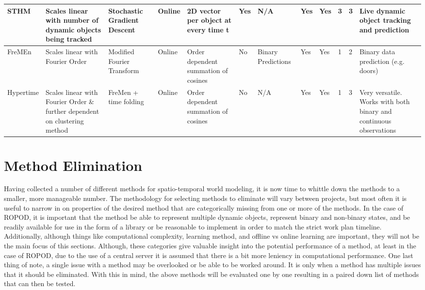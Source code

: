 \begin{table}[]
{\begin{tabular}{|p{3cm}|p{4cm}|p{3cm}|p{2cm}|p{3cm}|p{3cm}|p{3cm}|p{2cm}|p{2cm}|p{4cm}|p{4cm}|p{3cm}|}
  STHM      & Scales linear with number of dynamic objects being tracked                 & Stochastic Gradient Descent & Online            & 2D vector per object at every time t           & Yes           & N/A                    & Yes                    & Yes                   & 3                 & 3                         & Live dynamic object tracking and prediction                        \\ \hline
  FreMEn    & Scales linear with Fourier Order                                           & Modified Fourier Transform  & Online            & Order dependent summation of cosines           & No            & Binary Predictions     & Yes                    & Yes                   & 1                 & 2                         & Binary data prediction (e.g. doors)                                \\ \hline
  Hypertime & Scales linear with Fourier Order \& further dependent on clustering method & FreMen + time folding       & Online            & Order dependent summation of cosines           & No            & N/A                    & Yes                    & Yes                   & 1                 & 3                         & Very versatile. Works with both binary and continuous observations \\ \hline
  \end{tabular}%
  }
  \end{table}

  \section{ Method Elimination }

  Having collected a number of different methods for spatio-temporal world
  modeling, it is now time to whittle down the methods to a smaller, more
  manageable number. The methodology for selecting methods to eliminate will
  vary between projects, but most often it is useful to narrow in on properties
  of the desired method that are categorically missing from one or more of the
  methods. In the case of ROPOD, it is important that the method be able to
  represent multiple dynamic objects, represent binary and non-binary states,
  and be readily available for use in the form of a library or be reasonable to
  implement in order to match the strict work plan timeline. Additionally, although
  things like computational complexity, learning method, and offline vs online
  learning are important, they will not be the main focus of this sections.
  Although, these categories give valuable insight into the potential performance
  of a method, at least in the case of ROPOD, due to the use of a central server
  it is assumed that there is a bit more leniency in computational performance.
  One last thing of note, a single issue with a method may be overlooked or be
  able to be worked around. It is only when a method has multiple issues that
  it should be eliminated. With this in mind, the above methods will be
  evaluated one by one resulting in a paired down list of methods that can
  then be tested. \\

